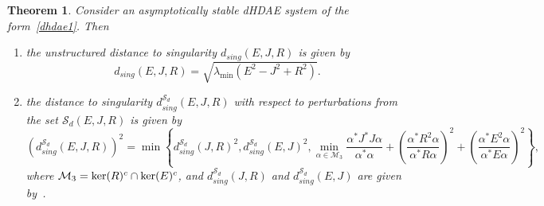 \documentclass[11pt]{article}
\newtheorem{theorem}{Theorem}
\begin{document}
\begin{theorem}\label{thm:dist-singEJR-d}
        Consider an asymptotically stable dHDAE system of the form~\eqref{dhdae1}. Then
    \begin{enumerate}
        \item the unstructured distance to singularity $d_{sing}(E,J,R)$ is given by
    \begin{equation}\label{Si:dist-sing-EJR1}
        d_{sing}(E,J,R)=\sqrt{\lambda_{\min}(E^2-J^2+R^2)}.
    \end{equation}
        \item the distance to singularity $d_{sing}^{\mathcal S_d}(E,J,R)$ with respect to perturbations from the set $\mathcal S_d(E,J,R)$ is given by
\begin{equation}\label{Sd:dist-sing-EJR}
(d_{sing}^{\mathcal S_d}(E,J,R))^2=\min\left\{d_{sing}^{\mathcal S_d}(J,R)^2,d_{sing}^{\mathcal S_d}(E,J)^2,
\min_{\alpha \in \mathcal M_3} \frac{\alpha^*J^*J\alpha}{\alpha^*\alpha}+
 \left(\frac{\alpha^*R^2\alpha}{\alpha^*R\alpha}\right)^2+ \left(\frac{\alpha^*E^2\alpha}{\alpha^*E\alpha}\right)^2
\right\},
   \end{equation}
where  $\mathcal M_3=\text{\rm ker}(R)^{c}\cap \text{\rm ker}(E)^{c}$,
and $d_{sing}^{\mathcal S_d}(J,R)$ and
$d_{sing}^{\mathcal S_d}(E,J)$ are given by~\cite[Table A.1]{PraS22}.
    \end{enumerate}
\end{theorem}
\end{document}
